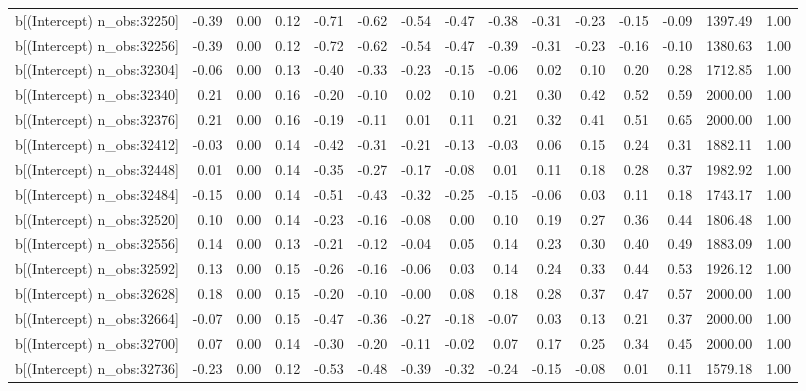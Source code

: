 \begin{table}[ht]
\begin{tabular}{rrrrrrrrrrrrrrr}
  b[(Intercept) n\_obs:32250] & -0.39 & 0.00 & 0.12 & -0.71 & -0.62 & -0.54 & -0.47 & -0.38 & -0.31 & -0.23 & -0.15 & -0.09 & 1397.49 & 1.00 \\ 
  b[(Intercept) n\_obs:32256] & -0.39 & 0.00 & 0.12 & -0.72 & -0.62 & -0.54 & -0.47 & -0.39 & -0.31 & -0.23 & -0.16 & -0.10 & 1380.63 & 1.00 \\ 
  b[(Intercept) n\_obs:32304] & -0.06 & 0.00 & 0.13 & -0.40 & -0.33 & -0.23 & -0.15 & -0.06 & 0.02 & 0.10 & 0.20 & 0.28 & 1712.85 & 1.00 \\ 
  b[(Intercept) n\_obs:32340] & 0.21 & 0.00 & 0.16 & -0.20 & -0.10 & 0.02 & 0.10 & 0.21 & 0.30 & 0.42 & 0.52 & 0.59 & 2000.00 & 1.00 \\ 
  b[(Intercept) n\_obs:32376] & 0.21 & 0.00 & 0.16 & -0.19 & -0.11 & 0.01 & 0.11 & 0.21 & 0.32 & 0.41 & 0.51 & 0.65 & 2000.00 & 1.00 \\ 
  b[(Intercept) n\_obs:32412] & -0.03 & 0.00 & 0.14 & -0.42 & -0.31 & -0.21 & -0.13 & -0.03 & 0.06 & 0.15 & 0.24 & 0.31 & 1882.11 & 1.00 \\ 
  b[(Intercept) n\_obs:32448] & 0.01 & 0.00 & 0.14 & -0.35 & -0.27 & -0.17 & -0.08 & 0.01 & 0.11 & 0.18 & 0.28 & 0.37 & 1982.92 & 1.00 \\ 
  b[(Intercept) n\_obs:32484] & -0.15 & 0.00 & 0.14 & -0.51 & -0.43 & -0.32 & -0.25 & -0.15 & -0.06 & 0.03 & 0.11 & 0.18 & 1743.17 & 1.00 \\ 
  b[(Intercept) n\_obs:32520] & 0.10 & 0.00 & 0.14 & -0.23 & -0.16 & -0.08 & 0.00 & 0.10 & 0.19 & 0.27 & 0.36 & 0.44 & 1806.48 & 1.00 \\ 
  b[(Intercept) n\_obs:32556] & 0.14 & 0.00 & 0.13 & -0.21 & -0.12 & -0.04 & 0.05 & 0.14 & 0.23 & 0.30 & 0.40 & 0.49 & 1883.09 & 1.00 \\ 
  b[(Intercept) n\_obs:32592] & 0.13 & 0.00 & 0.15 & -0.26 & -0.16 & -0.06 & 0.03 & 0.14 & 0.24 & 0.33 & 0.44 & 0.53 & 1926.12 & 1.00 \\ 
  b[(Intercept) n\_obs:32628] & 0.18 & 0.00 & 0.15 & -0.20 & -0.10 & -0.00 & 0.08 & 0.18 & 0.28 & 0.37 & 0.47 & 0.57 & 2000.00 & 1.00 \\ 
  b[(Intercept) n\_obs:32664] & -0.07 & 0.00 & 0.15 & -0.47 & -0.36 & -0.27 & -0.18 & -0.07 & 0.03 & 0.13 & 0.21 & 0.37 & 2000.00 & 1.00 \\ 
  b[(Intercept) n\_obs:32700] & 0.07 & 0.00 & 0.14 & -0.30 & -0.20 & -0.11 & -0.02 & 0.07 & 0.17 & 0.25 & 0.34 & 0.45 & 2000.00 & 1.00 \\ 
  b[(Intercept) n\_obs:32736] & -0.23 & 0.00 & 0.12 & -0.53 & -0.48 & -0.39 & -0.32 & -0.24 & -0.15 & -0.08 & 0.01 & 0.11 & 1579.18 & 1.00 \\ 

\end{tabular}
\end{table}
